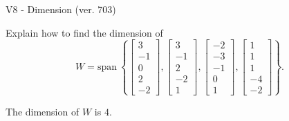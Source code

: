 \begin{exercise}
  \begin{exerciseTitle}V8 - Dimension (ver. 703)\end{exerciseTitle}
  \begin{exerciseStatement}
    Explain how to find the dimension of 
\[W=\mathrm{span}\ \left\{\left[\begin{array}{r}
3 \\
-1 \\
0 \\
2 \\
-2
\end{array}\right] , \left[\begin{array}{r}
3 \\
-1 \\
2 \\
-2 \\
1
\end{array}\right] , \left[\begin{array}{r}
-2 \\
-3 \\
-1 \\
0 \\
1
\end{array}\right] , \left[\begin{array}{r}
1 \\
1 \\
1 \\
-4 \\
-2
\end{array}\right]\right\}.\]



  \end{exerciseStatement}
  \begin{exerciseAnswer}
   The dimension of \(W\) is  \(4\).
  


  \end{exerciseAnswer}
\end{exercise}